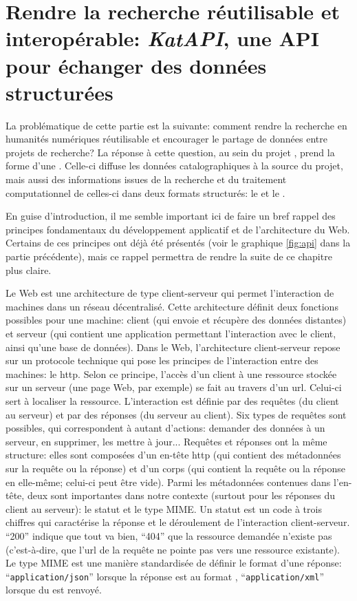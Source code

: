 
\part{Rendre la recherche réutilisable et interopérable: \textit{KatAPI}, une API pour échanger des données structurées}

La problématique de cette partie est la suivante: comment rendre la recherche en humanités numériques réutilisable et encourager le partage de données entre projets de recherche? La réponse à cette question, au sein du projet \mssktb{}, prend la forme d'une \api{}. Celle-ci diffuse les données catalographiques à la source du projet, mais aussi des informations issues de la recherche et du traitement computationnel de celles-ci dans deux formats structurés: le \json{} et le \xmltei{}.

En guise d'introduction, il me semble important ici de faire un bref rappel des principes fondamentaux du développement applicatif et de l'architecture du Web. Certains de ces principes ont déjà été présentés (voir le graphique \ref{fig:api} dans la partie précédente), mais ce rappel permettra de rendre la suite de ce chapitre plus claire.

Le Web est une architecture de type client-serveur qui permet l'interaction de machines dans un réseau décentralisé. Cette architecture définit deux fonctions possibles pour une machine: client (qui envoie et récupère des données distantes) et serveur (qui contient une application permettant l'interaction avec le client, ainsi qu'une base de données). Dans le Web, l'architecture client-serveur repose sur un protocole technique qui pose les principes de l'interaction entre des machines: le \gls{http}. Selon ce principe, l'accès d'un client à une ressource stockée sur un serveur (une page Web, par exemple) se fait au travers d'un \gls{url}. Celui-ci sert à localiser la ressource. L'interaction est définie par des requêtes (du client au serveur) et par des réponses (du serveur au client). Six types de requêtes sont possibles, qui correspondent à autant d'actions: demander des données à un serveur, en supprimer, les mettre à jour... Requêtes et réponses ont la même structure: elles sont composées d'un en-tête \gls{http} (qui contient des métadonnées sur la requête ou la réponse) et d'un corps (qui contient la requête ou la réponse en elle-même; celui-ci peut être vide). Parmi les métadonnées contenues dans l'en-tête, deux sont importantes dans notre contexte (surtout pour les réponses du client au serveur): le statut et le type MIME. Un statut est un code à trois chiffres qui caractérise la réponse et le déroulement de l'interaction client-serveur. \enquote{200} indique que tout va bien, \enquote{404} que la ressource demandée n'existe pas (c'est-à-dire, que l'\gls{url} de la requête ne pointe pas vers une ressource existante). Le type MIME est une manière standardisée de définir le format d'une réponse: \enquote{\texttt{application/json}} lorsque la réponse est au format \json{}, \enquote{\texttt{application/xml}} lorsque du \xml{} est renvoyé.

